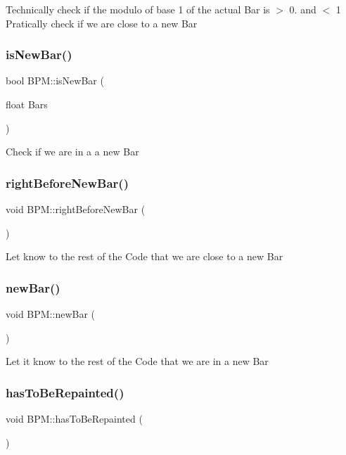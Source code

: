 Technically check if the modulo of base 1 of the actual Bar is $>$ 0. and $<$ 1 ~\newline
 Pratically check if we are close to a new Bar \mbox{\label{class_b_p_m_a70d08968386f82cd3005904be36d6083}} 
\subsubsection{\texorpdfstring{isNewBar()}{isNewBar()}}
{\footnotesize\ttfamily bool B\+P\+M\+::is\+New\+Bar (\begin{DoxyParamCaption}\item[{float}]{Bars }\end{DoxyParamCaption})}

Check if we are in a a new Bar \mbox{\label{class_b_p_m_ae33a544e6ed53ab10d48f4dd0d5f2a80}} 
\subsubsection{\texorpdfstring{rightBeforeNewBar()}{rightBeforeNewBar()}}
{\footnotesize\ttfamily void B\+P\+M\+::right\+Before\+New\+Bar (\begin{DoxyParamCaption}{ }\end{DoxyParamCaption})}

Let know to the rest of the Code that we are close to a new Bar \mbox{\label{class_b_p_m_aad9cc690db7262344f020276bff96052}} 
\subsubsection{\texorpdfstring{newBar()}{newBar()}}
{\footnotesize\ttfamily void B\+P\+M\+::new\+Bar (\begin{DoxyParamCaption}{ }\end{DoxyParamCaption})}

Let it know to the rest of the Code that we are in a new Bar \mbox{\label{class_b_p_m_a2745f897d9a943e9d74110a9d856df37}} 
\subsubsection{\texorpdfstring{hasToBeRepainted()}{hasToBeRepainted()}}
{\footnotesize\ttfamily void B\+P\+M\+::has\+To\+Be\+Repainted (\begin{DoxyParamCaption}{ }\end{DoxyParamCaption})}

